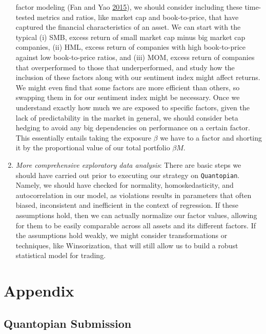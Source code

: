 \documentclass[11pt,]{article}
\begin{document}
\begin{enumerate}
  factor modeling (Fan and Yao \protect\hyperlink{ref-Fan2015}{2015}),
  we should consider including these time-tested metrics and ratios,
  like market cap and book-to-price, that have captured the financial
  characteristics of an asset. We can start with the typical (i) SMB,
  excess return of small market cap minus big market cap companies, (ii)
  HML, excess return of companies with high book-to-price against low
  book-to-price ratios, and (iii) MOM, excess return of companies that
  overperformed to those that underperformed, and study how the
  inclusion of these factors along with our sentiment index might affect
  returns. We might even find that some factors are more efficient than
  others, so swapping them in for our sentiment index might be
  necessary. Once we understand exactly how much we are exposed to
  specific factors, given the lack of predictability in the market in
  general, we should consider beta hedging to avoid any big dependencies
  on performance on a certain factor. This essentially entails taking
  the exposure \(\beta\) we have to a factor and shorting it by the
  proportional value of our total portfolio \(\beta M\).
\item
  \emph{More comprehensive exploratory data analysis}: There are basic
  steps we should have carried out prior to executing our strategy on
  \texttt{Quantopian}. Namely, we should have checked for normality,
  homoskedasticity, and autocorrelation in our model, as violations
  results in parameters that often biased, inconsistent and inefficient
  in the context of regression. If these assumptions hold, then we can
  actually normalize our factor values, allowing for them to be easily
  comparable across all assets and its different factors. If the
  assumptions hold weakly, we might consider transformations or
  techniques, like Winsorization, that will still allow us to build a
  robust statistical model for trading.
\end{enumerate}

\section{Appendix}\label{appendix}

\subsection{Quantopian Submission}\label{quantopian-submission}
\end{document}
